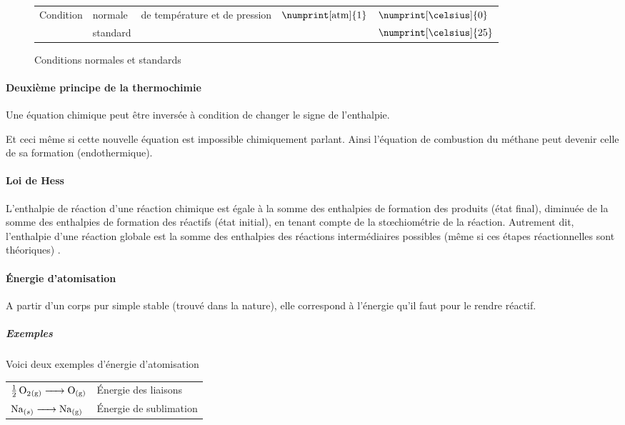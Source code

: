 \begin{figure}[h!]
  \begin{center}
    \begin{tabular}{|lllll|}
      \hline
      \multirow{2}{*}{Condition} & normale & \multirow{2}{*}{de température et de pression} & \multirow{2}{*}{$\numprint[\atm]{1}$} & $\numprint[\celsius]{0}$\\
                                          & standard & & & $\numprint[\celsius]{25}$\\
      \hline
    \end{tabular}
  \end{center}
  \label{fig:cntp}
  \caption{Conditions normales et standards}
\end{figure}

\paragraph{Deuxième principe de la thermochimie}
Une équation chimique peut être inversée à condition de changer le signe de l'enthalpie.

Et ceci même si cette nouvelle équation est impossible chimiquement parlant.
Ainsi l'équation de combustion du méthane peut devenir celle de sa formation (endothermique).


\paragraph{Loi de Hess}
L'enthalpie de réaction d'une réaction chimique est égale à la somme des enthalpies
de formation des produits (état final),
diminuée de la somme des enthalpies de formation des
réactifs (état initial),
en tenant compte de la st\oe{}chiométrie de la réaction.
Autrement dit,
l'enthalpie d'une réaction globale est la somme des enthalpies des réactions intermédiaires possibles (même si ces étapes réactionnelles sont théoriques) \cite[pp.~32,33]{legras}.

\paragraph{\'Energie d'atomisation}
A partir d'un corps pur simple stable (trouvé dans la nature),
elle correspond à l'énergie qu'il faut pour le rendre réactif.

\subparagraph{Exemples}
Voici deux exemples d'énergie d'atomisation
\begin{center}
  \begin{tabular}{ll}
    $\ce{1/2O2\gaz} \ce{-> O\gaz}$ & \'Energie des liaisons\\
    $\ce{Na}_{(s)} \ce{-> Na\gaz}$ & \'Energie de sublimation
  \end{tabular}
\end{center}

